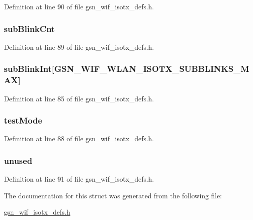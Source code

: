 Definition at line 90 of file gsn\_\-wif\_\-isotx\_\-defs.h.

\hypertarget{a00383_a7401ef0cfcbfa58025bfb197a472ff12}{
\subsubsection[{subBlinkCnt}]{ {\bf subBlinkCnt}}}
\label{a00383_a7401ef0cfcbfa58025bfb197a472ff12}


Definition at line 89 of file gsn\_\-wif\_\-isotx\_\-defs.h.

\hypertarget{a00383_a89c9e515e07a8cb3a9acea911fbd1c27}{
\subsubsection[{subBlinkInt}]{ {\bf subBlinkInt}\mbox{[}GSN\_\-WIF\_\-WLAN\_\-ISOTX\_\-SUBBLINKS\_\-MAX\mbox{]}}}
\label{a00383_a89c9e515e07a8cb3a9acea911fbd1c27}


Definition at line 85 of file gsn\_\-wif\_\-isotx\_\-defs.h.

\hypertarget{a00383_aecbbfdda9c54e1709aded6b98eea4689}{
\subsubsection[{testMode}]{ {\bf testMode}}}
\label{a00383_aecbbfdda9c54e1709aded6b98eea4689}


Definition at line 88 of file gsn\_\-wif\_\-isotx\_\-defs.h.

\hypertarget{a00383_a04efd61f68d1dcc6739211e703576ea7}{
\subsubsection[{unused}]{ {\bf unused}}}
\label{a00383_a04efd61f68d1dcc6739211e703576ea7}


Definition at line 91 of file gsn\_\-wif\_\-isotx\_\-defs.h.



The documentation for this struct was generated from the following file:\begin{DoxyCompactItemize}
\item 
\hyperlink{a00611}{gsn\_\-wif\_\-isotx\_\-defs.h}\end{DoxyCompactItemize}
